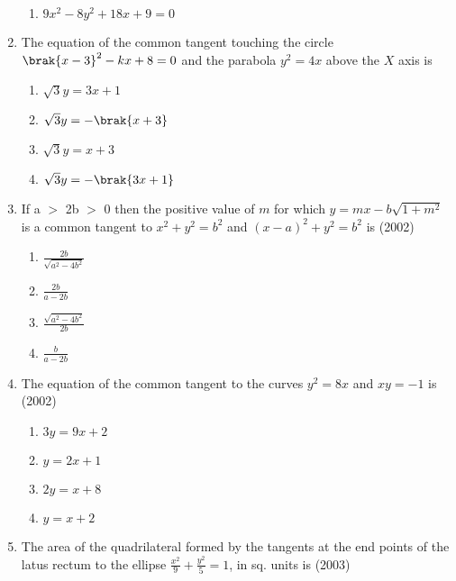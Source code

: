 \begin{enumerate}[label=\thesubsection.\arabic*.,ref=\thesubsection.\theenumi]
\begin{multicols}{2}
\begin{enumerate}
    \item $9x^2-8y^2+18x+9=0$
\end{enumerate}
\end{multicols}
\item The equation of the common tangent touching the circle $\brak{x-3}^2-kx+8=0$ and the parabola $y^2=4x$ above the $X$ axis is 
      \hfill{}
\begin{multicols}{2}
\begin{enumerate}
    \item $\sqrt{3}y=3x+1$
    \item $\sqrt{3}y=-\brak{x+3}$
    \item $\sqrt{3}y=x+3$
    \item $\sqrt{3}y=-\brak{3x+1}$
\end{enumerate}
\end{multicols}
\item If a $>$ 2b $>$ 0 then the positive value of $m$ for which       $y=mx-b\sqrt{1+m^{2}} $ is a common tangent to $x^{2} + y^{2} = b^{2} $ and  $(x-a)^{2} + y^{2} = b^{2}$ is   \hfill {(2002)}
\begin{multicols}{4}
\begin{enumerate}
    \item $\frac{2b}{\sqrt{a^{2}-4b^{2}}}$
    \item $\frac{2b}{a-2b}$
    \item $\frac{\sqrt{a^{2}-4b^{2}}}{2b}$
    \item $\frac{b}{a-2b}$
\end{enumerate}
\end{multicols}
\item The equation of the common tangent to the curves $y^{2}=8x$ and $xy=-1$ is \hfill{(2002)}
\begin{multicols}{4}
\begin{enumerate}
    \item $3y=9x+2$
    \item $y=2x+1$
    \item $2y=x+8$
    \item $y=x+2$
\end{enumerate}
\end{multicols}
\item The area of the quadrilateral formed by the tangents at the end points of the latus rectum to the ellipse $\frac{x^{2}}{9}+\frac{y^{2}}{5}=1$, in sq. units is \hfill{(2003)}
 \begin{multicols}{4}
\begin{enumerate}

\end{enumerate}
\end{multicols}
\end{enumerate}
